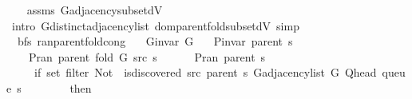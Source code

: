 \begin{isabellebody}
\endisataginvisible
{\isafoldinvisible}%
%
\isadeliminvisible
\isanewline
%
\endisadeliminvisible
%
\isadelimproof
\ \ %
\endisadelimproof
%
\isatagproof
{}\isamarkupfalse%
\ assms\ G{\isachardot}{\kern0pt}adjacency{\isacharunderscore}{\kern0pt}subset{\isacharunderscore}{\kern0pt}dV\isanewline
\ \ \isamarkupfalse%
\ {\isacharparenleft}{\kern0pt}intro\ G{\isachardot}{\kern0pt}distinct{\isacharunderscore}{\kern0pt}adjacency{\isacharunderscore}{\kern0pt}list\ dom{\isacharunderscore}{\kern0pt}parent{\isacharunderscore}{\kern0pt}fold{\isacharunderscore}{\kern0pt}subset{\isacharunderscore}{\kern0pt}dV{\isacharparenright}{\kern0pt}\ simp{\isacharplus}{\kern0pt}%
\endisatagproof
{\isafoldproof}%
%
\isadelimproof
\isanewline
%
\endisadelimproof
%
\isadeliminvisible
\isanewline
%
\endisadeliminvisible
%
\isataginvisible
{}\isamarkupfalse%
\ {\isacharparenleft}{\kern0pt}\ bfs{\isacharparenright}{\kern0pt}\ ran{\isacharunderscore}{\kern0pt}parent{\isacharunderscore}{\kern0pt}fold{\isacharunderscore}{\kern0pt}cong{\isacharcolon}{\kern0pt}\isanewline
\ \ \ {\isachardoublequoteopen}G{\isachardot}{\kern0pt}invar\ G{\isachardoublequoteclose}\isanewline
\ \ \ {\isachardoublequoteopen}P{\isacharunderscore}{\kern0pt}invar\ {\isacharparenleft}{\kern0pt}parent\ s{\isacharparenright}{\kern0pt}{\isachardoublequoteclose}\isanewline
\ \ \isanewline
\ \ \ \ {\isachardoublequoteopen}P{\isachardot}{\kern0pt}ran\ {\isacharparenleft}{\kern0pt}parent\ {\isacharparenleft}{\kern0pt}fold\ G\ src\ s{\isacharparenright}{\kern0pt}{\isacharparenright}{\kern0pt}\ {\isacharequal}{\kern0pt}\isanewline
\ \ \ \ \ P{\isachardot}{\kern0pt}ran\ {\isacharparenleft}{\kern0pt}parent\ s{\isacharparenright}{\kern0pt}\ {\isasymunion}\isanewline
\ \ \ \ \ {\isacharparenleft}{\kern0pt}if\ set\ {\isacharparenleft}{\kern0pt}filter\ {\isacharparenleft}{\kern0pt}Not\ {\isasymcirc}\ is{\isacharunderscore}{\kern0pt}discovered\ src\ {\isacharparenleft}{\kern0pt}parent\ s{\isacharparenright}{\kern0pt}{\isacharparenright}{\kern0pt}\ {\isacharparenleft}{\kern0pt}G{\isachardot}{\kern0pt}adjacency{\isacharunderscore}{\kern0pt}list\ G\ {\isacharparenleft}{\kern0pt}Q{\isacharunderscore}{\kern0pt}head\ {\isacharparenleft}{\kern0pt}queue\ s{\isacharparenright}{\kern0pt}{\isacharparenright}{\kern0pt}{\isacharparenright}{\kern0pt}{\isacharparenright}{\kern0pt}\ {\isacharequal}{\kern0pt}\ {\isacharbraceleft}{\kern0pt}{\isacharbraceright}{\kern0pt}\isanewline
\ \ \ \ \ \ then\ {\isacharbraceleft}{\kern0pt}{\isacharbraceright}{\kern0pt}\isanewline

\end{isabellebody}
